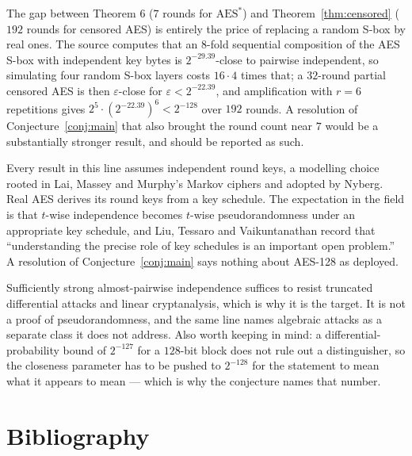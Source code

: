 \documentclass{aicr-conjecture}
\newcommand{\eps}{\varepsilon}
\begin{document}
\begin{remark}\label{rem:192}
The gap between Theorem 6 ($7$ rounds for $\mathrm{AES}^{\ast}$) and
Theorem~\ref{thm:censored} ($192$ rounds for censored AES) is entirely
the price of replacing a random S-box by real ones. The source computes
that an $8$-fold sequential composition of the AES S-box with independent
key bytes is $2^{-29.39}$-close to pairwise independent, so simulating
four random S-box layers costs $16 \cdot 4$ times that; a $32$-round
partial censored AES is then $\eps$-close for $\eps < 2^{-22.39}$, and
amplification with $r = 6$ repetitions gives $2^{5} \cdot
(2^{-22.39})^{6} < 2^{-128}$ over $192$ rounds. A resolution of
Conjecture~\ref{conj:main} that also brought the round count near $7$
would be a substantially stronger result, and should be reported as such.
\end{remark}

\begin{remark}\label{rem:keys}
Every result in this line assumes independent round keys, a modelling
choice rooted in Lai, Massey and Murphy's Markov ciphers and adopted by
Nyberg. Real AES derives its round keys from a key schedule. The
expectation in the field is that $t$-wise independence becomes $t$-wise
pseudorandomness under an appropriate key schedule, and
Liu, Tessaro and Vaikuntanathan record that ``understanding the precise role
of key schedules is an important open problem.'' A resolution of
Conjecture~\ref{conj:main} says nothing about AES-128 as deployed.
\end{remark}

\begin{remark}\label{rem:scope}
Sufficiently strong almost-pairwise independence suffices to resist
truncated differential attacks and linear cryptanalysis, which is why it
is the target. It is not a proof of pseudorandomness, and the same line
names algebraic attacks as a separate class it does not address. Also
worth keeping in mind: a differential-probability bound of $2^{-127}$ for
a $128$-bit block does not rule out a distinguisher, so the closeness
parameter has to be pushed to $2^{-128}$ for the statement to mean what
it appears to mean --- which is why the conjecture names that number.
\end{remark}

\section{Bibliography}
\end{document}
